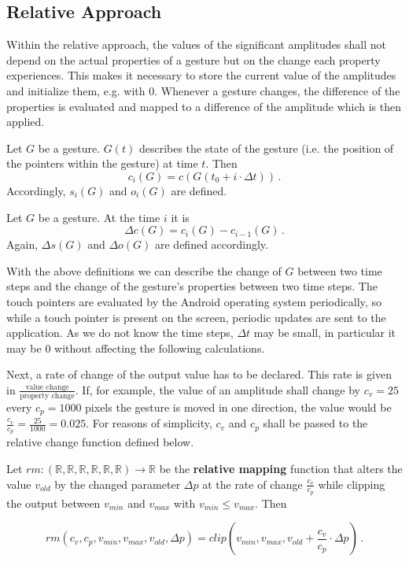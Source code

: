 \subsection{Relative Approach}
\label{sec:app:rel}
Within the relative approach, the values of the significant amplitudes shall not depend on the actual properties of a gesture but on the change each property experiences. This makes it necessary to store the current value of the amplitudes and initialize them, e.g. with 0. Whenever a gesture changes, the difference of the properties is evaluated and mapped to a difference of the amplitude which is then applied.

\begin{defn}
Let $G$ be a gesture. $G(t)$ describes the state of the gesture (i.e. the position of the pointers within the gesture) at time $t$. Then
\begin{equation}
c_i(G) = c(G(t_0 + i \cdot \Delta t)) \, .
\end{equation}
Accordingly, $s_i(G)$ and $o_i(G)$ are defined.
\end{defn}

\begin{defn}
Let $G$ be a gesture. At the time $i$ it is
\begin{equation}
\Delta c(G) = c_i(G) - c_{i - 1}(G) \, .
\end{equation}
Again, $\Delta s(G)$ and $\Delta o(G)$ are defined accordingly.
\end{defn}

With the above definitions we can describe the change of $G$ between two time steps and the change of the gesture's properties between two time steps. The touch pointers are evaluated by the Android operating system periodically, so while a touch pointer is present on the screen, periodic updates are sent to the application. As we do not know the time steps, $\Delta t$ may be small, in particular it may be $0$ without affecting the following calculations.

Next, a rate of change of the output value has to be declared. This rate is given in $\frac{\text{value change}}{\text{property change}}$. If, for example, the value of an amplitude shall change by $c_v = 25$ every $c_p = 1000$ pixels the gesture is moved in one direction, the value would be $\frac{c_v}{c_p} = \frac{25}{1000} = 0.025$. For reasons of simplicity, $c_v$ and $c_p$ shall be passed to the relative change function defined below.

\begin{defn}
Let $rm : (\mathbb{R}, \mathbb{R}, \mathbb{R}, \mathbb{R}, \mathbb{R}, \mathbb{R}) \rightarrow \mathbb{R}$ be the \textbf{relative mapping} function that alters the value $v_{old}$ by the changed parameter $\Delta p$ at the rate of change $\frac{c_v}{c_p}$ while clipping the output between $v_{min}$ and $v_{max}$ with $v_{min} \leq v_{max}$. Then

\begin{equation}
rm(c_v, c_p, v_{min}, v_{max}, v_{old}, \Delta p) = clip(v_{min}, v_{max}, v_{old} + \frac{c_v}{c_p} \cdot \Delta p) \, .
\end{equation}
\end{defn}

